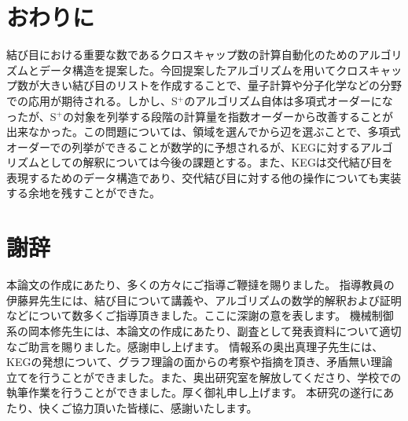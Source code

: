 \documentclass[11pt,a4j]{jarticle}
\newcommand{\splus}{S${}^\text{+}$}
\begin{document}
\section{おわりに}
結び目における重要な数であるクロスキャップ数の計算自動化のためのアルゴリズムとデータ構造を提案した。今回提案したアルゴリズムを用いてクロスキャップ数が大きい結び目のリストを作成することで、量子計算や分子化学などの分野での応用が期待される。しかし、\splus のアルゴリズム自体は多項式オーダーになったが、\splus の対象を列挙する段階の計算量を指数オーダーから改善することが出来なかった。この問題については、領域を選んでから辺を選ぶことで、多項式オーダーでの列挙ができることが数学的に予想されるが、KEGに対するアルゴリズムとしての解釈については今後の課題とする。また、KEGは交代結び目を表現するためのデータ構造であり、交代結び目に対する他の操作についても実装する余地を残すことができた。

\section*{謝辞} %
本論文の作成にあたり、多くの方々にご指導ご鞭撻を賜りました。
指導教員の伊藤昇先生には、結び目について講義や、アルゴリズムの数学的解釈および証明などについて数多くご指導頂きました。ここに深謝の意を表します。
機械制御系の岡本修先生には、本論文の作成にあたり、副査として発表資料について適切なご助言を賜りました。感謝申し上げます。
情報系の奥出真理子先生には、KEGの発想について、グラフ理論の面からの考察や指摘を頂き、矛盾無い理論立てを行うことができました。また、奥出研究室を解放してくださり、学校での執筆作業を行うことができました。厚く御礼申し上げます。
本研究の遂行にあたり、快くご協力頂いた皆様に、感謝いたします。

\end{document}
